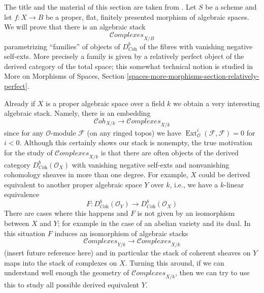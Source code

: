\documentclass{stacks-project}
\theoremstyle{plain}
\theoremstyle{definition}
\theoremstyle{remark}
\numberwithin{equation}{subsection}
\def\Ext{\mathop{\mathrm{Ext}}\nolimits}
\def\Cohstack{\mathcal{C}\!\mathit{oh}}
\def\Complexesstack{\mathcal{C}\!\mathit{omplexes}}
\begin{document}
\noindent
The title and the material of this section are taken from
\cite{lieblich-complexes}. Let $S$ be a scheme and let
$f : X \to B$ be a proper, flat, finitely presented morphism
of algebraic spaces. We will prove that there is an
algebraic stack
$$
\Complexesstack_{X/B}
$$
parametrizing ``families'' of objects of $D^b_{\textit{Coh}}$
of the fibres with vanishing negative self-exts. More precisely
a family is given by a relatively perfect object of the derived
category of the total space; this somewhat technical notion
is studied in
More on Morphisms of Spaces, Section
\ref{spaces-more-morphisms-section-relatively-perfect}.

\medskip\noindent
Already if $X$ is a proper algebraic
space over a field $k$ we obtain a very interesting algebraic stack.
Namely, there is an embedding
$$
\Cohstack_{X/k} \longrightarrow \Complexesstack_{X/k}
$$
since for any $\mathcal{O}$-module $\mathcal{F}$ (on any ringed topos)
we have $\Ext^i_\mathcal{O}(\mathcal{F}, \mathcal{F}) = 0$ for $i < 0$.
Although this certainly shows our stack is nonempty, the
true motivation for the study of $\Complexesstack_{X/k}$
is that there are often objects of the derived category
$D^b_{\textit{Coh}}(\mathcal{O}_X)$ with vanishing negative self-exts
and nonvanishing cohomology sheaves in more than one degree.
For example, $X$ could be derived equivalent to another
proper algebraic space $Y$ over $k$, i.e., we have a
$k$-linear equivalence
$$
F : D^b_{\textit{Coh}}(\mathcal{O}_Y)
\longrightarrow
D^b_{\textit{Coh}}(\mathcal{O}_X)
$$
There are cases where this happens and $F$ is not given by
an isomorphism between $X$ and $Y$; for example in the case
of an abelian variety and its dual. In this situation $F$ induces
an isomorphism of algebraic stacks
$$
\Complexesstack_{Y/k}
\longrightarrow
\Complexesstack_{X/k}
$$
(insert future reference here) and in particular the stack of coherent sheaves
on $Y$ maps into the stack of complexes on $X$. Turning this around,
if we can understand well enough the geometry of
$\Complexesstack_{X/k}$, then we can try to use this to study all possible
derived equivalent $Y$.
\end{document}

